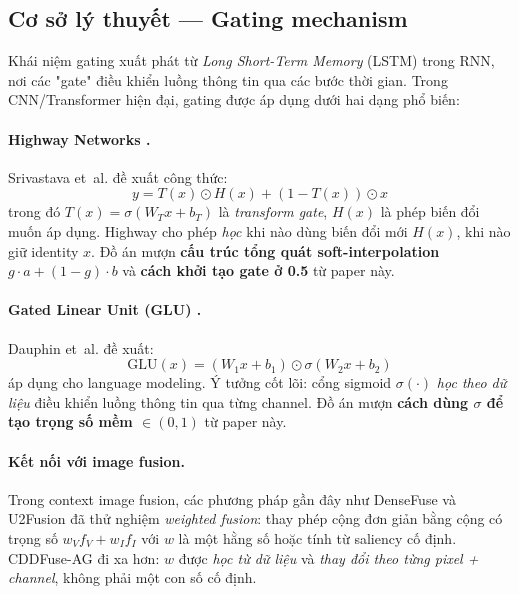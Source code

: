 \subsection{Cơ sở lý thuyết --- Gating mechanism}

Khái niệm gating xuất phát từ \emph{Long Short-Term Memory} (LSTM) trong RNN, nơi các "gate" điều khiển luồng thông tin qua các bước thời gian. Trong CNN/Transformer hiện đại, gating được áp dụng dưới hai dạng phổ biến:

\paragraph{Highway Networks \cite{srivastava2015highway}.}
Srivastava et~al. đề xuất công thức:
\begin{equation}
y = T(x) \odot H(x) + (1 - T(x)) \odot x
\label{eq:highway}
\end{equation}
trong đó $T(x) = \sigma(W_T x + b_T)$ là \emph{transform gate}, $H(x)$ là phép biến đổi muốn áp dụng. Highway cho phép \emph{học} khi nào dùng biến đổi mới $H(x)$, khi nào giữ identity $x$. Đồ án mượn \textbf{cấu trúc tổng quát soft-interpolation} $g \cdot a + (1-g) \cdot b$ và \textbf{cách khởi tạo gate ở 0.5} từ paper này.

\paragraph{Gated Linear Unit (GLU) \cite{dauphin2017glu}.}
Dauphin et~al. đề xuất:
\begin{equation}
\mathrm{GLU}(x) = (W_1 x + b_1) \odot \sigma(W_2 x + b_2)
\label{eq:glu}
\end{equation}
áp dụng cho language modeling. Ý tưởng cốt lõi: cổng sigmoid $\sigma(\cdot)$ \emph{học theo dữ liệu} điều khiển luồng thông tin qua từng channel. Đồ án mượn \textbf{cách dùng $\sigma$ để tạo trọng số mềm $\in (0, 1)$} từ paper này.

\paragraph{Kết nối với image fusion.}
Trong context image fusion, các phương pháp gần đây như DenseFuse \cite{li2019densefuse} và U2Fusion \cite{xu2020u2fusion} đã thử nghiệm \emph{weighted fusion}: thay phép cộng đơn giản bằng cộng có trọng số $w_V f_V + w_I f_I$ với $w$ là một hằng số hoặc tính từ saliency cố định. CDDFuse-AG đi xa hơn: $w$ được \emph{học từ dữ liệu} và \emph{thay đổi theo từng pixel + channel}, không phải một con số cố định.

